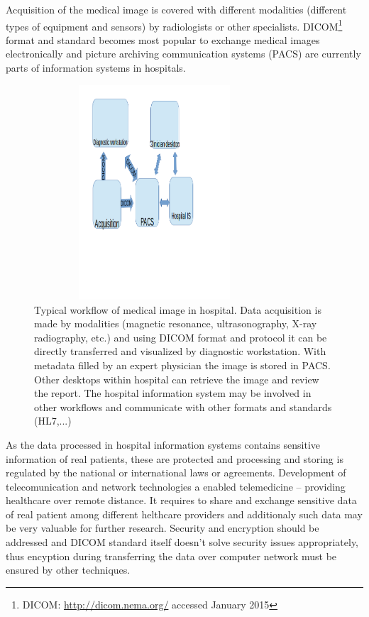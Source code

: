 Acquisition of the medical image is covered with different modalities (different types of equipment and sensors) by radiologists or other specialists. DICOM\footnote{DICOM: \url{http://dicom.nema.org/} accessed January 2015} format and standard becomes most popular to exchange medical images electronically and picture archiving communication systems (PACS) are currently parts of information systems in hospitals.

\begin{figure}[ht]
    \centering
    \includegraphics[width=0.8\textwidth, height=8cm]{chapter4/pacs.png}
    \caption{Typical workflow of medical image in hospital. Data acquisition is made by modalities (magnetic resonance, ultrasonography, X-ray radiography, etc.) and using DICOM format and protocol it can be directly transferred and visualized by diagnostic workstation. With metadata filled by an expert physician the image is stored in PACS. Other desktops within hospital can retrieve the image and review the report. The hospital information system may be involved in other workflows and communicate with other formats and standards (HL7,...)
    }
    \label{fig:pacs}
\end{figure}

As the data processed in hospital information systems contains sensitive information of real patients, these are protected and processing and storing is regulated by the national or international laws or agreements.
Development of telecomunication and network technologies a enabled telemedicine -- providing healthcare over remote distance. It requires to share and exchange  sensitive data of real patient among different helthcare providers and additionaly such data may be very valuable for further research. Security and encryption should be addressed and DICOM standard itself doesn't solve security issues appropriately, thus encyption during transferring the data over computer network must be ensured by other techniques.

